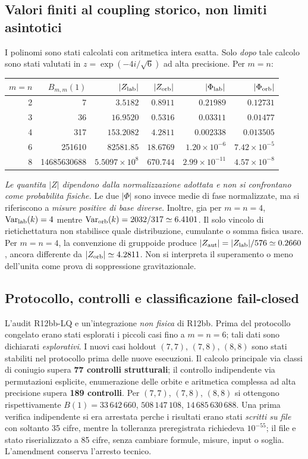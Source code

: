 \documentclass[11pt,a4paper]{article}
\begin{document}
\subsection*{Valori finiti al coupling storico, non limiti asintotici}
I polinomi sono stati calcolati con aritmetica intera esatta. Solo \emph{dopo} tale calcolo sono stati valutati in $z=\exp(-4i/\sqrt6)$ ad alta precisione. Per $m=n$:
\begin{center}\small
\begin{tabular}{rrrrrr}
\toprule
$m=n$ & $B_{m,m}(1)$ & $|Z_{\rm lab}|$ & $|Z_{\rm orb}|$ & $|\Phi_{\rm lab}|$ & $|\Phi_{\rm orb}|$\\\midrule
2 & 7 & $3.5182$ & $0.8911$ & $0.21989$ & $0.12731$\\
3 & 36 & $16.9520$ & $0.5316$ & $0.03311$ & $0.01477$\\
4 & 317 & $153.2082$ & $4.2811$ & $0.002338$ & $0.013505$\\
6 & 251610 & $82581.85$ & $18.6769$ & $1.20\times 10^{-6}$ & $7.42\times10^{-5}$\\
8 & 14685630688 & $5.5097\times10^8$ & $670.744$ & $2.99\times10^{-11}$ & $4.57\times10^{-8}$\\
\bottomrule
\end{tabular}
\end{center}
\textit{Le quantita $|Z|$ dipendono dalla normalizzazione adottata e non si confrontano come probabilita fisiche.} Le due $|\Phi|$ sono invece medie di fase normalizzate, ma si riferiscono a \emph{misure positive di base diverse}. Inoltre, gia per $m=n=4$, $\operatorname{Var}_{\rm lab}(k)=4$ mentre $\operatorname{Var}_{\rm orb}(k)=2032/317\simeq6.4101$. Il solo vincolo di rietichettatura non stabilisce quale distribuzione, cumulante o somma fisica usare. Per $m=n=4$, la convenzione di gruppoide produce $|Z_{\rm aut}|=|Z_{\rm lab}|/576\simeq0.2660$, ancora differente da $|Z_{\rm orb}|\simeq4.2811$. Non si interpreta il superamento o meno dell'unita come prova di soppressione gravitazionale.

\subsection*{Protocollo, controlli e classificazione fail-closed}
L'audit R12bb-LQ e un'integrazione \emph{non fisica} di R12bb. Prima del protocollo congelato erano stati esplorati i piccoli casi fino a $m=n=6$; tali dati sono dichiarati \emph{esplorativi}. I nuovi casi holdout $(7,7)$, $(7,8)$, $(8,8)$ sono stati stabiliti nel protocollo prima delle nuove esecuzioni. Il calcolo principale via classi di coniugio supera \textbf{77 controlli strutturali}; il controllo indipendente via permutazioni esplicite, enumerazione delle orbite e aritmetica complessa ad alta precisione supera \textbf{189 controlli}. Per $(7,7)$, $(7,8)$, $(8,8)$ si ottengono rispettivamente $B(1)=33\,642\,660$, $508\,147\,108$, $14\,685\,630\,688$. Una prima verifica indipendente si era arrestata perche i risultati erano stati \emph{scritti su file} con soltanto 35 cifre, mentre la tolleranza preregistrata richiedeva $10^{-55}$; il file e stato riserializzato a 85 cifre, senza cambiare formule, misure, input o soglia. L'amendment conserva l'arresto tecnico.
\end{document}

